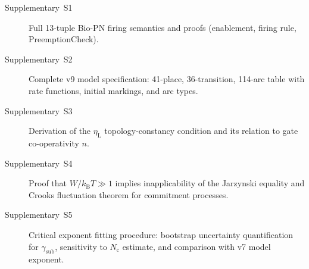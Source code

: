 \documentclass[11pt,a4paper]{article}
\newcommand{\kB}{k_{\mathrm{B}}}
\newcommand{\etaL}{\eta_{\mathrm{L}}}
\newcommand{\gsub}{\gamma_{\mathrm{sub}}}
\newcommand{\Nc}{N_{\mathrm{c}}}
\begin{document}
\begin{description}
  \item[Supplementary~S1] Full 13-tuple Bio-PN firing semantics and
    proofs (enablement, firing rule, PreemptionCheck).
  \item[Supplementary~S2] Complete v9 model specification: 41-place,
    36-transition, 114-arc table with rate functions, initial markings,
    and arc types.
  \item[Supplementary~S3] Derivation of the $\etaL$ topology-constancy
    condition and its relation to gate co-operativity $n$.
  \item[Supplementary~S4] Proof that $W/\kB T \gg 1$ implies
    inapplicability of the Jarzynski equality and Crooks fluctuation
    theorem for commitment processes.
  \item[Supplementary~S5] Critical exponent fitting procedure:
    bootstrap uncertainty quantification for $\gsub$, sensitivity to
    $\Nc$ estimate, and comparison with v7 model exponent.
\end{description}
\end{document}
